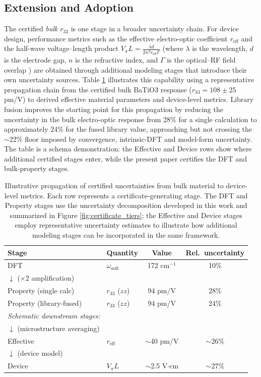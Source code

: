 \documentclass[twocolumn,superscriptaddress,amsmath,amssymb,longbibliography]{revtex4-2}
\begin{document}
\subsection{Extension and Adoption}

The certified {\em bulk} $r_{33}$ is one stage in a broader uncertainty chain. For device design, performance metrics such as the effective electro-optic coefficient $r_{\mathrm{eff}}$ and the half-wave voltage--length product $V_\pi L = \frac{\lambda d}{2 n^3 r_{\mathrm{eff}} \Gamma}$ (where $\lambda$ is the wavelength, $d$ is the electrode gap, $n$ is the refractive index, and $\Gamma$ is the optical--RF field overlap \cite{Wooten2000,Reed2010,Wang2018_LN_thin}) are obtained through additional modeling stages that introduce their own uncertainty sources. Table \ref{tab:propagation} illustrates this capability using a representative propagation chain from the certified bulk BaTiO$3$ response ($r_{33}=108 \pm 25$ pm/V) to derived effective material parameters and device-level metrics. Library fusion improves the starting point for this propagation by reducing the uncertainty in the bulk electro-optic response from 28\% for a single calculation to approximately 24\% for the fused library value, approaching but not crossing the $\sim$22\% floor imposed by convergence, intrinsic-DFT and model-form uncertainty. The table is a schema demonstration: the Effective and Device rows show where additional certified stages enter, while the present paper certifies the DFT and bulk-property stages.

\begin{table}
\centering
\caption{Illustrative propagation of certified uncertainties from bulk material to device-level metrics. Each row represents a certificate-generating stage. The DFT and Property stages use the uncertainty decomposition developed in this work and summarized in   Figure \ref{fig:certificate_tiers}; the Effective and Device stages employ representative uncertainty estimates to illustrate how additional modeling stages can be incorporated in the same framework. }
\label{tab:propagation}
\begin{tabular}{llcc}
\toprule
Stage & Quantity & Value & Rel.\ uncertainty \\
\midrule
DFT & $\omega_{\mathrm{soft}}$ & 172 cm$^{-1}$ & 10\% \\
$\downarrow$ ($\times 2$ amplification) & & & \\
Property (single calc) & $r_{33}$ ($zz$) & 94 pm/V & 28\% \\
Property (library-fused) & $r_{33}$ ($zz$) & 94 pm/V & 24\% \\
\midrule
\multicolumn{4}{l}{\textit{Schematic downstream stages:}} \\
$\downarrow$ (microstructure averaging) & & & \\
Effective & $r_{\mathrm{eff}}$ & $\sim$40 pm/V & $\sim$26\% \\
$\downarrow$ (device model) & & & \\
Device & $V_\pi L$ & $\sim$2.5 V$\cdot$cm & $\sim$27\% \\
\bottomrule
\end{tabular}
\end{table}
\end{document}
